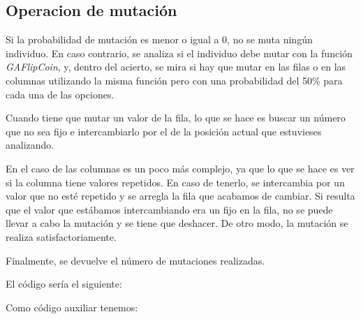 \documentclass[a4,11pt]{article}
\begin{document}
\newcommand{\grisclaro}{\color[gray]{0.99}}
\newcommand{\gris}{\color[gray]{0.9}}
\newcommand{\grisos}{\color[gray]{0.5}}

\newcommand{\showprog}[1]
{
\begin{minipage}{\textwidth}

 {#1}
\end{minipage} 
}    

 
\subsection{Operacion de mutación}\label{des:mutacion}

Si la probabilidad de mutación es menor o igual a 0, no se muta ningún individuo. En caso contrario, se analiza si el individuo debe mutar con la función \emph{GAFlipCoin}, y, dentro del acierto, se mira si hay que mutar en las filas o en las columnas utilizando la misma función pero con una probabilidad del 50\% para cada una de las opciones.

	Cuando tiene que mutar un valor de la fila, lo que se hace es buscar un número que no sea fijo e intercambiarlo por el de la posición actual que estuvieses analizando.

	En el caso de las columnas es un poco más complejo, ya que lo que se hace es ver si la columna tiene valores repetidos. En caso de tenerlo, se intercambia por un valor que no esté repetido y se arregla la fila que acabamos de cambiar. Si resulta que el valor que estábamos intercambiando era un fijo en la fila, no se puede llevar a cabo la mutación y se tiene que deshacer. De otro modo, la mutación se realiza satisfactoriamente.

	Finalmente, se devuelve el número de mutaciones realizadas.

	El código sería el siguiente:






	Como código auxiliar tenemos:

\end{document}
